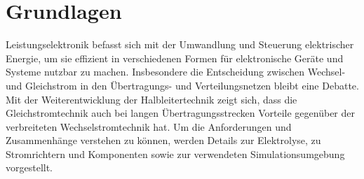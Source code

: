 \chapter{Grundlagen}
\label{sec:Grundlagen}
Leistungselektronik befasst sich mit der Umwandlung und Steuerung elektrischer Energie, um sie effizient in verschiedenen Formen für elektronische Geräte und Systeme nutzbar zu machen. Insbesondere die Entscheidung zwischen Wechsel- und Gleichstrom in den Übertragungs- und Verteilungsnetzen bleibt eine Debatte. Mit der Weiterentwicklung der Halbleitertechnik zeigt sich, dass die Gleichstromtechnik auch bei langen Übertragungsstrecken Vorteile gegenüber der verbreiteten Wechselstromtechnik hat. Um die Anforderungen und Zusammenhänge verstehen zu können, werden Details zur Elektrolyse, zu Stromrichtern und Komponenten sowie zur verwendeten Simulationsumgebung vorgestellt.

